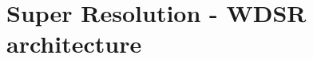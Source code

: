 \documentclass{standalone}
\begin{document}
\section[WDSR]{Super Resolution - WDSR architecture}\label{sr}

\end{document}

